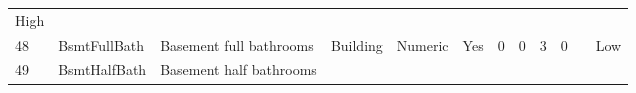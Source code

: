 \documentclass[11pt]{article}
\begin{document}
\begin{longtable}[]{@{}llllllllllll@{}}
\begin{minipage}[t]{0.04\columnwidth}
High\strut
\end{minipage}\tabularnewline
\begin{minipage}[t]{0.04\columnwidth}\raggedright\strut
48\strut
\end{minipage} & \begin{minipage}[t]{0.04\columnwidth}\raggedright\strut
BsmtFullBath\strut
\end{minipage} & \begin{minipage}[t]{0.04\columnwidth}\raggedright\strut
Basement full bathrooms\strut
\end{minipage} & \begin{minipage}[t]{0.04\columnwidth}\raggedright\strut
Building\strut
\end{minipage} & \begin{minipage}[t]{0.04\columnwidth}\raggedright\strut
Numeric\strut
\end{minipage} & \begin{minipage}[t]{0.04\columnwidth}\raggedright\strut
Yes\strut
\end{minipage} & \begin{minipage}[t]{0.04\columnwidth}\raggedright\strut
0\strut
\end{minipage} & \begin{minipage}[t]{0.04\columnwidth}\raggedright\strut
0\strut
\end{minipage} & \begin{minipage}[t]{0.04\columnwidth}\raggedright\strut
3\strut
\end{minipage} & \begin{minipage}[t]{0.04\columnwidth}\raggedright\strut
0\strut
\end{minipage} & \begin{minipage}[t]{0.04\columnwidth}\raggedright\strut
\strut
\end{minipage} & \begin{minipage}[t]{0.04\columnwidth}\raggedright\strut
Low\strut
\end{minipage}\tabularnewline
\begin{minipage}[t]{0.04\columnwidth}\raggedright\strut
49\strut
\end{minipage} & \begin{minipage}[t]{0.04\columnwidth}\raggedright\strut
BsmtHalfBath\strut
\end{minipage} & \begin{minipage}[t]{0.04\columnwidth}\raggedright\strut
Basement half bathrooms\strut
\end{minipage} & \begin{minipage}[t]{0.04\columnwidth}\raggedright\strut

\end{minipage}
\end{longtable}
\end{document}
